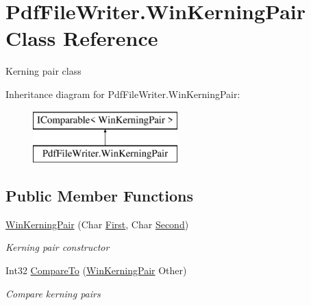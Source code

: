 \hypertarget{class_pdf_file_writer_1_1_win_kerning_pair}{}\section{Pdf\+File\+Writer.\+Win\+Kerning\+Pair Class Reference}
\label{class_pdf_file_writer_1_1_win_kerning_pair}


Kerning pair class  


Inheritance diagram for Pdf\+File\+Writer.\+Win\+Kerning\+Pair\+:\begin{figure}[H]
\begin{center}
\leavevmode
\includegraphics[height=2.000000cm]{class_pdf_file_writer_1_1_win_kerning_pair}
\end{center}
\end{figure}
\subsection*{Public Member Functions}
\begin{DoxyCompactItemize}
\item 
\hyperlink{class_pdf_file_writer_1_1_win_kerning_pair_af330b337b85411355b7522efaffb573d}{Win\+Kerning\+Pair} (Char \hyperlink{class_pdf_file_writer_1_1_win_kerning_pair_a28a730271ac7d7e3d963dd8dfab66a8d}{First}, Char \hyperlink{class_pdf_file_writer_1_1_win_kerning_pair_aa9993861b118f4511b96654bb209f6b3}{Second})
\begin{DoxyCompactList}\small\item\em Kerning pair constructor \end{DoxyCompactList}\item 
Int32 \hyperlink{class_pdf_file_writer_1_1_win_kerning_pair_a1ce6a398c3a5bb1f5b3f7f79b9ec5eb0}{Compare\+To} (\hyperlink{class_pdf_file_writer_1_1_win_kerning_pair}{Win\+Kerning\+Pair} Other)
\begin{DoxyCompactList}\small\item\em Compare kerning pairs \end{DoxyCompactList}\end{DoxyCompactItemize}

